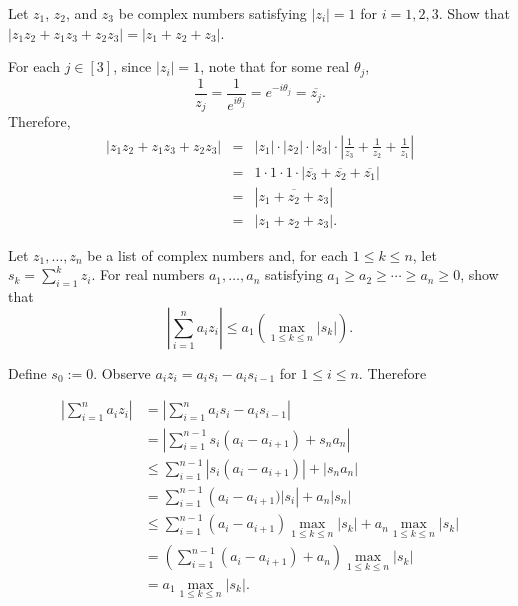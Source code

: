 \begin{problem}[Golan 16]
Let $z_1$, $z_2$, and $z_3$ be complex numbers satisfying 
$|z_i| = 1$ for $i = 1, 2, 3$. Show that 
$|z_1 z_2 + z_1 z_3 + z_2 z_3 | = |z_1 + z_2 + z_3|$.
\end{problem}
\smallskip
\begin{solution}
For each $j \in [3]$, since $|z_i|=1$, note that for some real $\theta_j$,
$$\frac{1}{z_j}  = \frac{1}{e^{i\theta_j}} = e^{-i\theta_j}= \overline{z_j}.$$
Therefore,
\begin{eqnarray*}
|z_1 z_2 + z_1 z_3 + z_2 z_3 | & = & |z_1| \cdot |z_2| \cdot |z_3| \cdot \left|\frac{1}{z_3} + \frac{1}{z_2} + \frac{1}{z_1}\right|\\
& = & 1 \cdot 1 \cdot 1 \cdot | \overline{z_3} + \overline{z_2} + \overline{z_1} | \\
& = &  | \overline{z_1 + z_2 + z_3} | \\
& = & |z_1 + z_2 + z_3 |.
\end{eqnarray*}

\end{solution}
\probskip




\begin{problem} 
Let $z_1, \dots, z_n$ be a list of complex
numbers and, for each $1 \leq k \leq n$, 
let $s_k = \sum_{i=1}^k z_i$. For real numbers
$a_1, \dots, a_n$ satisfying 
$a_1 \geq a_2 \geq \cdots \geq a_n \geq 0$, 
show that
\begin{equation}
\label{eq:Abels}  
\left| \sum_{i=1}^n a_i z_i \right| 
\leq a_1 \left( \max_{1 \leq k \leq n} |s_k|\right).
\end{equation}
\end{problem}
\smallskip
\begin{solution}

Define $s_0:=0$. Observe $a_iz_i = a_is_i - a_is_{i-1}$ for $1\leq i\leq n$. Therefore


\begin{align*}
\left|\sum_{i=1}^n a_iz_i \right| & = \left|\sum_{i=1}^n  a_i s_i - a_i s_{i-1}\right|\\
&= \left|\sum_{i=1}^{n-1} s_i(a_i-a_{i+1}) + s_n a_n \right|\\
&\leq \sum_{i=1}^{n-1} \left|s_i (a_i-a_{i+1})\right| + \left|s_n a_n\right|  \tag*{by the Triangle Inequality}\\
&= \sum_{i=1}^{n-1} \left(a_i-a_{i+1})|s_i\right| + a_n\left|s_n\right| \\
&\leq \sum_{i=1}^{n-1}(a_i-a_{i+1}) \max_{1 \leq k \leq n} |s_k| +  a_n\max_{1 \leq k \leq n} |s_k| \\
&= \left(\sum_{i=1}^{n-1} (a_i-a_{i+1}) + a_n\right) \max_{1 \leq k \leq n} |s_k| \\
&= a_1 \max_{1 \leq k \leq n}  |s_k|. \tag*{by telescoping sums}
\end{align*}
\end{solution}
\probskip



